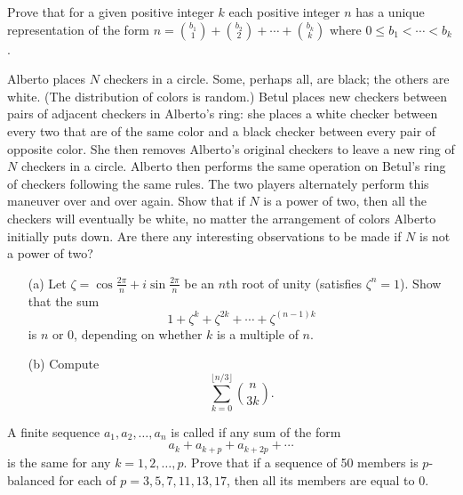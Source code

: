 \documentclass[12pt]{article}
\begin{document}
        \begin{exercise}
        Prove that for a given positive integer $k$ each positive integer $n$ has a unique representation of the form $n=\binom{b_1}{1}+\binom{b_2}{2}+\cdots+\binom{b_k}{k}$ where $0\leq b_1<\cdots< b_k$. 
        \end{exercise}
        
        \begin{exercise}
        Alberto places \(N\) checkers in a circle. Some, perhaps all, are black; the others are white.
        (The distribution of colors is random.) Betul places new checkers between pairs of adjacent checkers in
        Alberto's ring: she places a white checker between every two that are of the same color and a black checker
        between every pair of opposite color. She then removes Alberto's original checkers to leave a new ring of \(N\)
        checkers in a circle. Alberto then performs the same operation on Betul's ring of checkers following the same
        rules. The two players alternately perform this maneuver over and over again. Show that if \(N\) is a power
        of two, then all the checkers will eventually be white, no matter the arrangement of colors Alberto initially
        puts down. Are there any interesting observations to be made if \(N\) is not a power of two?
        \end{exercise}
        
        \begin{exercise}
        \begin{enumerate}
            \item[(a)] Let \(\zeta=\cos\frac{2\pi}{n} + i\sin\frac{2\pi}{n}\) be an \(n\)th root of unity (satisfies \(\zeta^n=1\)).
            Show that the sum
            \[1 + \zeta^k + \zeta^{2k} + \cdots + \zeta^{(n-1)k}\]
            is \(n\) or 0, depending on whether \(k\) is a multiple of \(n\).
            \item[(b)] Compute
            \[\sum_{k=0}^{\lfloor n/3\rfloor}\binom{n}{3k}.\]
        \end{enumerate}
        \end{exercise}
        
        \begin{exercise}
        A finite sequence \(a_1,a_2,\ldots,a_n\) is called  if any sum of the form
        \[a_k + a_{k+p} + a_{k+2p} + \cdots\]
        is the same for any \(k=1,2,\ldots,p\).
        Prove that if a sequence of 50 members is \(p\)-balanced for each of \(p=3,5,7,11,13,17\), then all its members are equal to 0.
        \end{exercise}
        
\end{document}
